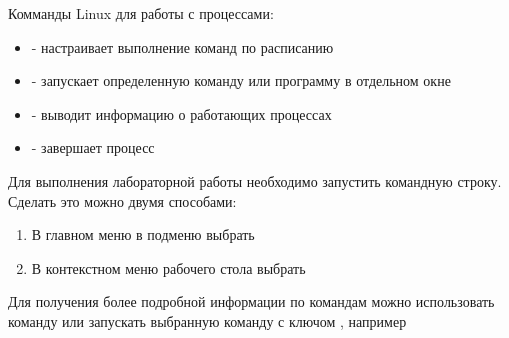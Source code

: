 \documentclass[a4paper,12pt]{article}
\begin{document}

    \begin{flushleft}
        Комманды Linux для работы с процессами:
        \begin{itemize}
            \item {} - настраивает выполнение команд по расписанию
            \item {} - запускает определенную команду или программу в отдельном окне
            \item {} - выводит информацию о работающих процессах
            \item {} - завершает процесс
        \end{itemize}
    \end{flushleft}
  
    \begin{flushleft}
        Для выполнения лабораторной работы необходимо запустить командную строку. Сделать это можно двумя способами:
        \begin{enumerate}
            \item В главном меню в подменю  выбрать 
            \item В контекстном меню рабочего стола выбрать 
        \end{enumerate}
    \end{flushleft}
  
    \begin{flushleft}
        Для получения более подробной информации по командам можно использовать команду  или запускать выбранную команду с ключом , например  \linebreak
    \end{flushleft}
\end{document}

